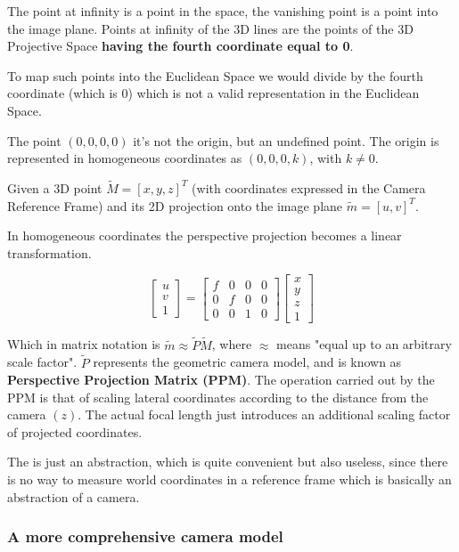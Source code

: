 \documentclass{article}
\begin{document}
The point at infinity is a point in the space, the vanishing point is a point into the image plane.
Points at infinity of the 3D lines are the points of the 3D Projective Space \textbf{having the fourth coordinate equal to 0}.

To map such points into the Euclidean Space we would divide by the fourth coordinate (which is 0) which is not a valid representation in the Euclidean Space.

The point $(0,0,0,0)$ it's not the origin, but an undefined point. The origin is represented in homogeneous coordinates as $(0,0,0,k)$, with $k\neq 0$.

Given a 3D point $\tilde{M} = [x,y,z]^T$ (with coordinates expressed in the Camera Reference Frame) and its 2D projection onto the image plane $\tilde{m} = [u,v]^T$.

In homogeneous coordinates the perspective projection becomes a linear transformation.

$$
\begin{bmatrix}
u \\ v \\ 1
\end{bmatrix} =
\begin{bmatrix}
f & 0 & 0 & 0 \\
0 & f & 0 & 0 \\
0 & 0 & 1 & 0 
\end{bmatrix}
\begin{bmatrix}
x \\ y \\ z \\ 1
\end{bmatrix}
$$

Which in matrix notation is $\tilde{m} \approx \tilde{P}\tilde{M}$, where $\approx$ means "equal up to an arbitrary scale factor".
\vspace{1em}
$\tilde{P}$ represents the geometric camera model, and is known as \textbf{Perspective Projection Matrix (PPM)}.
\vspace{1em}
The operation carried out by the PPM is that of scaling lateral coordinates according to the distance from the camera $(z)$.
The actual focal length just introduces an additional scaling factor of projected coordinates.

The is just an abstraction, which is quite convenient but also useless, since there is no way to measure world coordinates in a reference frame which is basically an abstraction of a camera.

\subsubsection{A more comprehensive camera model}
\end{document}
